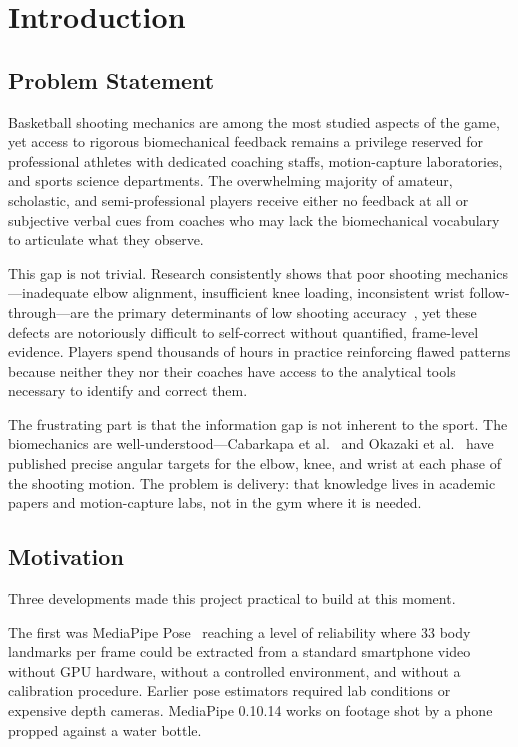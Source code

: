 \chapter{Introduction}
\label{chap:introduction}

\section{Problem Statement}
\label{sec:problem}

Basketball shooting mechanics are among the most studied aspects of the game, yet access to rigorous biomechanical feedback remains a privilege reserved for professional athletes with dedicated coaching staffs, motion-capture laboratories, and sports science departments. The overwhelming majority of amateur, scholastic, and semi-professional players receive either no feedback at all or subjective verbal cues from coaches who may lack the biomechanical vocabulary to articulate what they observe.

This gap is not trivial. Research consistently shows that poor shooting mechanics---inadequate elbow alignment, insufficient knee loading, inconsistent wrist follow-through---are the primary determinants of low shooting accuracy~\cite{Cabarkapa2021}, yet these defects are notoriously difficult to self-correct without quantified, frame-level evidence. Players spend thousands of hours in practice reinforcing flawed patterns because neither they nor their coaches have access to the analytical tools necessary to identify and correct them.

The frustrating part is that the information gap is not inherent to the sport. The biomechanics are well-understood---Cabarkapa et al.~\cite{Cabarkapa2021} and Okazaki et al.~\cite{Okazaki2012} have published precise angular targets for the elbow, knee, and wrist at each phase of the shooting motion. The problem is delivery: that knowledge lives in academic papers and motion-capture labs, not in the gym where it is needed.

\section{Motivation}
\label{sec:motivation}

Three developments made this project practical to build at this moment.

The first was MediaPipe Pose~\cite{Lugaresi2019} reaching a level of reliability where 33 body landmarks per frame could be extracted from a standard smartphone video without GPU hardware, without a controlled environment, and without a calibration procedure. Earlier pose estimators required lab conditions or expensive depth cameras. MediaPipe 0.10.14 works on footage shot by a phone propped against a water bottle.

